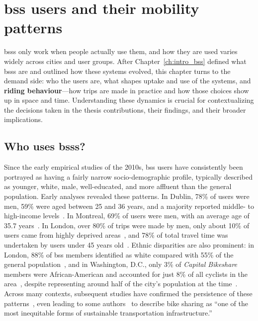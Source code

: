    
\chapter[BSS users and their mobility patterns]{\ac{bss} users and their mobility patterns}
\label{ch:bss_users_and_their_mobility_patterns}

\acp{bss} only work when people actually use them, and how they are used varies widely across cities and user groups. After Chapter~\ref{ch:intro_bss} defined what \acp{bss} are and outlined how these systems evolved, this chapter turns to the demand side: who the users are, what shapes uptake and use of the systems, and \textbf{riding behaviour}---how trips are made in practice and how those choices show up in space and time. Understanding these dynamics is crucial for contextualizing the decisions taken in the thesis contributions, their findings, and their broader implications.

\section[Who uses BSSs?]{Who uses \acp{bss}?}
\label{sec:who_uses_bss}

Since the early empirical studies of the 2010s, \ac{bss} users have consistently been portrayed as having a fairly narrow socio-demographic profile, typically described as younger, white, male, well-educated, and more affluent than the general population. Early analyses revealed these patterns. In Dublin, 78\% of users were men, 59\% were aged between 25 and 36 years, and a majority reported middle- to high-income levels~\cite{Murphy2015}. In Montreal, 69\% of users were men, with an average age of 35.7 years~\cite{BachandMarleau2012}. In London, over 80\% of trips were made by men, only about 10\% of users came from highly deprived areas~\cite{Goodman2014}, and 78\% of total travel time was undertaken by users under 45 years old~\cite{Woodcock2014}. Ethnic disparities are also prominent: in London, 88\% of \ac{bss} members identified as white compared with 55\% of the general population~\cite{Fishman2016}, and in Washington, D.C., only 3\% of \textit{Capital Bikeshare} members were African-American and accounted for just 8\% of all cyclists in the area~\cite{Buck2013}, despite representing around half of the city’s population at the time~\cite{Fishman2016}. Across many contexts, subsequent studies have confirmed the persistence of these patterns~\cite{Shaheen2014, Fishman2013, Fishman2014, Bauman2017, Ogilvie2012, Steinbach2011, Willberg2021, Waldner2025}, even leading to some authors~\cite{Hoffmann2016} to describe bike sharing as “one of the most inequitable forms of sustainable transportation infrastructure.”

